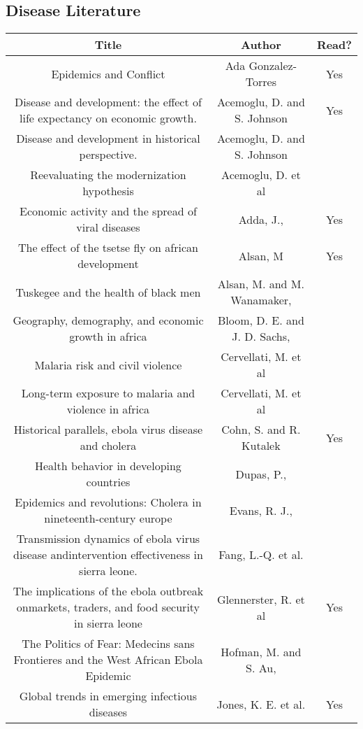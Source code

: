 \documentclass[10pt,a4paper]{article}
\begin{document}
\subsection*{Disease Literature}
\begin{center}
\begin{tabular}{|c|c|c|}
\hline 
Title & Author & Read? \\ 
\hline 
Epidemics and Conflict & Ada Gonzalez-Torres & Yes\\ 
\hline 
{\tiny Disease and development: the effect of life expectancy on economic growth.} & Acemoglu, D. and S. Johnson & Yes\\ 
\hline 
Disease and development in historical perspective. & Acemoglu, D. and S. Johnson & \\ 
\hline 
Reevaluating the modernization hypothesis & Acemoglu, D. et al & \\ 
\hline 
Economic activity and the spread of viral diseases & Adda, J., & Yes\\ 
\hline 
The effect of the tsetse fly on african development & Alsan, M & Yes\\ 
\hline 
Tuskegee and the health of black men & Alsan, M. and M. Wanamaker, & \\ 
\hline 
Geography, demography, and economic growth in africa & Bloom, D. E. and J. D. Sachs, & \\ 
\hline 
Malaria risk and civil violence & Cervellati, M. et al & \\ 
\hline 
Long-term exposure to malaria and violence in africa & Cervellati, M. et al & \\ 
\hline 
Historical parallels, ebola virus disease and cholera & Cohn, S. and R. Kutalek & Yes\\ 
\hline 
Health behavior in developing countries & Dupas, P., & \\ 
\hline 
{\tiny Epidemics and revolutions: Cholera in nineteenth-century europe} & Evans, R. J., & \\ 
\hline
{\tiny Transmission dynamics of ebola virus disease andintervention effectiveness in sierra leone.} & Fang, L.-Q. et al. & \\ 
\hline 
{\tiny The implications of the ebola outbreak onmarkets, traders, and food security in sierra leone} & Glennerster, R. et al & Yes\\ 
\hline 
{\tiny The Politics of Fear: Medecins sans Frontieres and the West African Ebola Epidemic} & Hofman, M. and S. Au, & \\ 
\hline
Global trends in emerging infectious diseases & Jones, K. E. et al. & Yes\\ 

\end{tabular}
\end{center}
\end{document}
